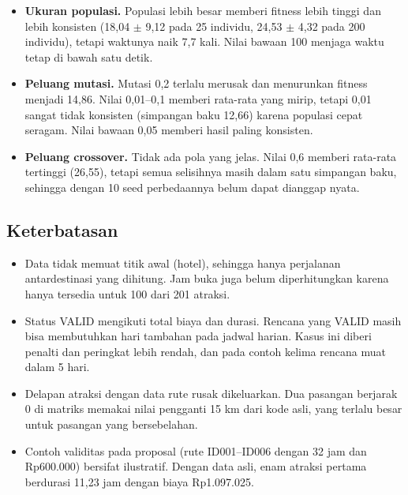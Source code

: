\begin{itemize}
  \item \textbf{Ukuran populasi.} Populasi lebih besar memberi fitness lebih tinggi dan lebih konsisten (18,04 $\pm$ 9,12 pada 25 individu, 24,53 $\pm$ 4,32 pada 200 individu), tetapi waktunya naik 7,7 kali. Nilai bawaan 100 menjaga waktu tetap di bawah satu detik.
  \item \textbf{Peluang mutasi.} Mutasi 0,2 terlalu merusak dan menurunkan fitness menjadi 14,86. Nilai 0,01--0,1 memberi rata-rata yang mirip, tetapi 0,01 sangat tidak konsisten (simpangan baku 12,66) karena populasi cepat seragam. Nilai bawaan 0,05 memberi hasil paling konsisten.
  \item \textbf{Peluang crossover.} Tidak ada pola yang jelas. Nilai 0,6 memberi rata-rata tertinggi (26,55), tetapi semua selisihnya masih dalam satu simpangan baku, sehingga dengan 10 seed perbedaannya belum dapat dianggap nyata.
\end{itemize}

\subsection{Keterbatasan}

\begin{itemize}
  \item Data tidak memuat titik awal (hotel), sehingga hanya perjalanan antardestinasi yang dihitung. Jam buka juga belum diperhitungkan karena hanya tersedia untuk 100 dari 201 atraksi.
  \item Status VALID mengikuti total biaya dan durasi. Rencana yang VALID masih bisa membutuhkan hari tambahan pada jadwal harian. Kasus ini diberi penalti dan peringkat lebih rendah, dan pada contoh  kelima rencana muat dalam 5 hari.
  \item Delapan atraksi dengan data rute rusak dikeluarkan. Dua pasangan berjarak 0 di matriks memakai nilai pengganti 15 km dari kode asli, yang terlalu besar untuk pasangan yang bersebelahan.
  \item Contoh validitas pada proposal (rute ID001--ID006 dengan 32 jam dan Rp600.000) bersifat ilustratif. Dengan data asli, enam atraksi pertama berdurasi 11,23 jam dengan biaya Rp1.097.025.
\end{itemize}
